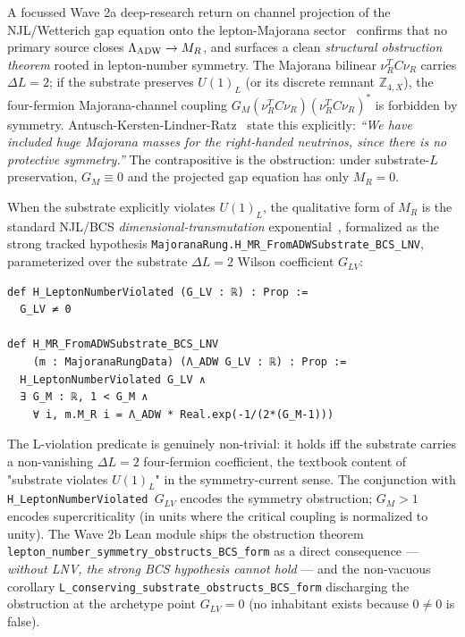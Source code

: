 \documentclass[aps,prd,twocolumn,showpacs,superscriptaddress,nofootinbib]{revtex4-2}
\newcommand{\HeavyMaj}{M_R}
\newcommand{\LambdaADW}{\Lambda_{\rm ADW}}
\begin{document}
A focussed Wave 2a deep-research return on channel projection of the
NJL/Wetterich gap equation onto the lepton-Majorana
sector~\cite{AntuschKerstenLindnerRatz2003,Hill2024Bilocal} confirms
that no primary source closes $\LambdaADW \to \HeavyMaj$, and surfaces a
clean \emph{structural obstruction theorem} rooted in lepton-number
symmetry. The Majorana bilinear $\nu_R^T C \nu_R$ carries $\Delta L = 2$;
if the substrate preserves $U(1)_L$ (or its discrete remnant
$\mathbb{Z}_{4,X}$), the four-fermion Majorana-channel coupling
$G_M (\nu_R^T C \nu_R)(\nu_R^T C \nu_R)^*$ is forbidden by symmetry.
Antusch-Kersten-Lindner-Ratz~\cite{AntuschKerstenLindnerRatz2003}
state this explicitly: \emph{``We have included huge Majorana masses for
the right-handed neutrinos, since there is no protective symmetry.''} The
contrapositive is the obstruction: under substrate-$L$ preservation,
$G_M \equiv 0$ and the projected gap equation has only $\HeavyMaj = 0$.

When the substrate explicitly violates $U(1)_L$, the qualitative form of
$\HeavyMaj$ is the standard NJL/BCS \emph{dimensional-transmutation}
exponential~\cite{AntuschKerstenLindnerRatz2003}, formalized as the
strong tracked hypothesis
\texttt{MajoranaRung.H\_MR\_FromADWSubstrate\_BCS\_LNV}, parameterized
over the substrate $\Delta L = 2$ Wilson coefficient $G_{LV}$:
\begin{verbatim}
def H_LeptonNumberViolated (G_LV : ℝ) : Prop :=
  G_LV ≠ 0

def H_MR_FromADWSubstrate_BCS_LNV
    (m : MajoranaRungData) (Λ_ADW G_LV : ℝ) : Prop :=
  H_LeptonNumberViolated G_LV ∧
  ∃ G_M : ℝ, 1 < G_M ∧
    ∀ i, m.M_R i = Λ_ADW * Real.exp(-1/(2*(G_M-1)))
\end{verbatim}

The L-violation predicate is genuinely non-trivial: it holds iff the
substrate carries a non-vanishing $\Delta L = 2$ four-fermion coefficient,
the textbook content of "substrate violates $U(1)_L$" in the
symmetry-current sense. The conjunction with
\texttt{H\_LeptonNumberViolated $G_{LV}$} encodes the symmetry obstruction;
$G_M > 1$ encodes supercriticality (in units where the critical coupling
is normalized to unity). The Wave 2b Lean module ships the obstruction
theorem
\texttt{lepton\_number\_symmetry\_obstructs\_BCS\_form} as a direct
consequence — \emph{without LNV, the strong BCS hypothesis cannot hold} —
and the non-vacuous corollary
\texttt{L\_conserving\_substrate\_obstructs\_BCS\_form} discharging the
obstruction at the archetype point $G_{LV} = 0$ (no inhabitant exists
because $0 \neq 0$ is false).
\end{document}
